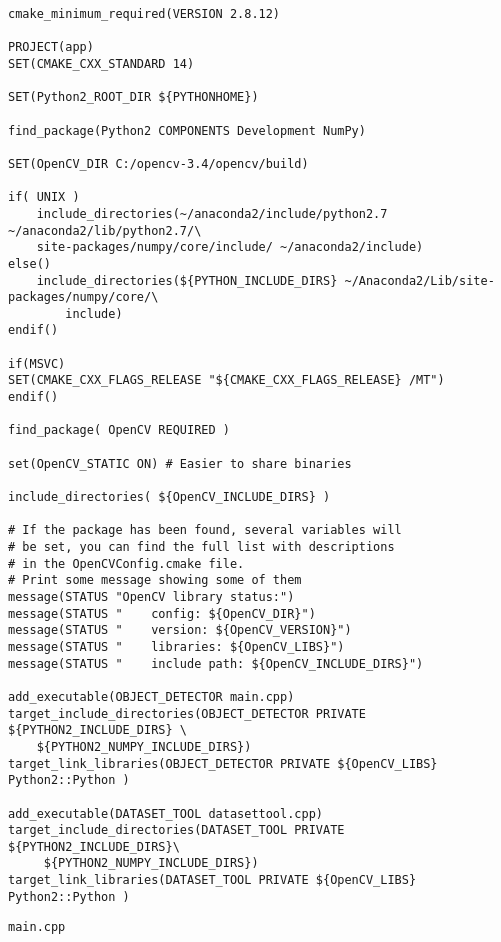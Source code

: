 \begin{verbatim}
cmake_minimum_required(VERSION 2.8.12)

PROJECT(app)
SET(CMAKE_CXX_STANDARD 14)

SET(Python2_ROOT_DIR ${PYTHONHOME})

find_package(Python2 COMPONENTS Development NumPy)

SET(OpenCV_DIR C:/opencv-3.4/opencv/build)

if( UNIX )
    include_directories(~/anaconda2/include/python2.7 ~/anaconda2/lib/python2.7/\
    site-packages/numpy/core/include/ ~/anaconda2/include)
else()
    include_directories(${PYTHON_INCLUDE_DIRS} ~/Anaconda2/Lib/site-packages/numpy/core/\
    	include)
endif()

if(MSVC)
SET(CMAKE_CXX_FLAGS_RELEASE "${CMAKE_CXX_FLAGS_RELEASE} /MT")
endif()

find_package( OpenCV REQUIRED )

set(OpenCV_STATIC ON) # Easier to share binaries

include_directories( ${OpenCV_INCLUDE_DIRS} )

# If the package has been found, several variables will
# be set, you can find the full list with descriptions
# in the OpenCVConfig.cmake file.
# Print some message showing some of them
message(STATUS "OpenCV library status:")
message(STATUS "    config: ${OpenCV_DIR}")
message(STATUS "    version: ${OpenCV_VERSION}")
message(STATUS "    libraries: ${OpenCV_LIBS}")
message(STATUS "    include path: ${OpenCV_INCLUDE_DIRS}")

add_executable(OBJECT_DETECTOR main.cpp)
target_include_directories(OBJECT_DETECTOR PRIVATE ${PYTHON2_INCLUDE_DIRS} \
	${PYTHON2_NUMPY_INCLUDE_DIRS})
target_link_libraries(OBJECT_DETECTOR PRIVATE ${OpenCV_LIBS} Python2::Python )

add_executable(DATASET_TOOL datasettool.cpp)
target_include_directories(DATASET_TOOL PRIVATE ${PYTHON2_INCLUDE_DIRS}\
	 ${PYTHON2_NUMPY_INCLUDE_DIRS})
target_link_libraries(DATASET_TOOL PRIVATE ${OpenCV_LIBS} Python2::Python )
\end{verbatim}

\clearpage
\begin{verbatim}
main.cpp
\end{verbatim}

